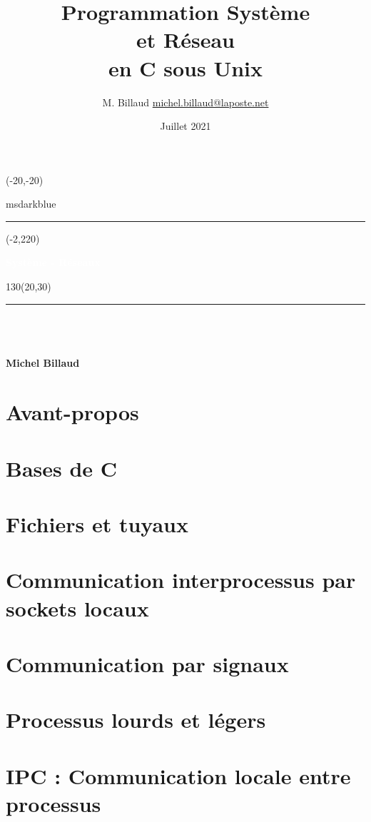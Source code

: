 \documentclass[10pt,twoside,a4paper,openright]{extreport}
\title{
  Programmation Système \\
  et Réseau \\ en C sous Unix
}
\author{M. Billaud \url{michel.billaud@laposte.net}}
\date{Juillet 2021}
\renewcommand{\maketitle}{

\begin{titlepage}
\setlength{\TPHorizModule}{1mm}
\setlength{\TPVertModule}{1mm}
 
 \begin{textblock}{50}(-20,-20)
  \begin{color}{msdarkblue}
    \rule{3cm}{25.5cm}    
  \end{color}
\end{textblock}

\begin{textblock}{20}(-2,220)
\begin{rotate}{90}
{\huge\bfseries\textcolor{white}{Système - Réseaux}}
\end{rotate}
\end{textblock}
 
 \begin{textblock}{130}(20,30)
 {\noindent\rule{2cm}{2cm}}
 \\[5em]

{
\noindent\Huge\bf \noindent \thetitle } \\[5em]
 
{\noindent\Large\bfseries\sf \thedate} \\[10em]

{\noindent\Large\bfseries\sf Michel Billaud}

 \end{textblock}
\end{titlepage}
\makeatother

\clearpage
}
\begin{document}
 
\sloppy
\maketitle
\begin{abstract}

\end{abstract}

\newpage 
\tableofcontents

\newpage

\chapter*{Avant-propos}



\newpage


\chapter{Bases de C}



\chapter{Fichiers et tuyaux}





\chapter{Communication interprocessus par sockets locaux}




\chapter{Communication par signaux}



\chapter{Processus lourds et légers}




\chapter{IPC : Communication locale entre processus}


\end{document}
